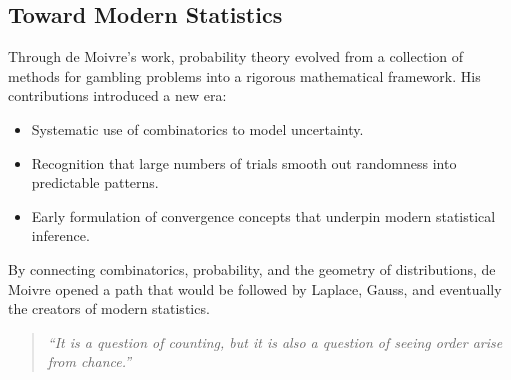 \subsection{Toward Modern Statistics}

Through de Moivre's work, probability theory evolved from a collection of methods for gambling problems into a rigorous mathematical framework. His contributions introduced a new era:

\begin{itemize}
    \item Systematic use of combinatorics to model uncertainty.
    \item Recognition that large numbers of trials smooth out randomness into predictable patterns.
    \item Early formulation of convergence concepts that underpin modern statistical inference.
\end{itemize}

By connecting combinatorics, probability, and the geometry of distributions, de Moivre opened a path that would be followed by Laplace, Gauss, and eventually the creators of modern statistics.

\begin{quote}
    \textit{``It is a question of counting, but it is also a question of seeing order arise from chance.''}
\end{quote}
